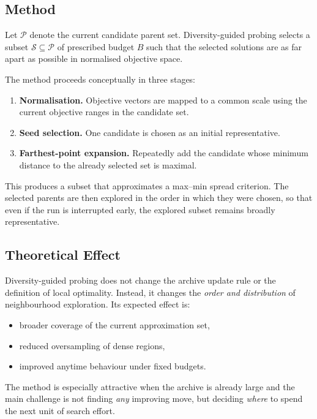 \documentclass[11pt,a4paper]{article}
\newcommand{\calP}{\ensuremath{\mathcal{P}}}
\newcommand{\calS}{\ensuremath{\mathcal{S}}}
\begin{document}
\subsection{Method}

Let \(\calP\) denote the current candidate parent set.  Diversity-guided
probing selects a subset \(\calS \subseteq \calP\) of prescribed budget
\(B\) such that the selected solutions are as far apart as possible in
normalised objective space.

The method proceeds conceptually in three stages:
\begin{enumerate}
  \item \textbf{Normalisation.}  Objective vectors are mapped to a
    common scale using the current objective ranges in the candidate
    set.
  \item \textbf{Seed selection.}  One candidate is chosen as an initial
    representative.
  \item \textbf{Farthest-point expansion.}  Repeatedly add the candidate
    whose minimum distance to the already selected set is maximal.
\end{enumerate}

This produces a subset that approximates a max--min spread criterion.
The selected parents are then explored in the order in which they were
chosen, so that even if the run is interrupted early, the explored
subset remains broadly representative.

\subsection{Theoretical Effect}

Diversity-guided probing does not change the archive update rule or the
definition of local optimality.  Instead, it changes the \emph{order and
distribution} of neighbourhood exploration.  Its expected effect is:
\begin{itemize}
  \item broader coverage of the current approximation set,
  \item reduced oversampling of dense regions,
  \item improved anytime behaviour under fixed budgets.
\end{itemize}

The method is especially attractive when the archive is already large
and the main challenge is not finding \emph{any} improving move, but
deciding \emph{where} to spend the next unit of search effort.
\end{document}
